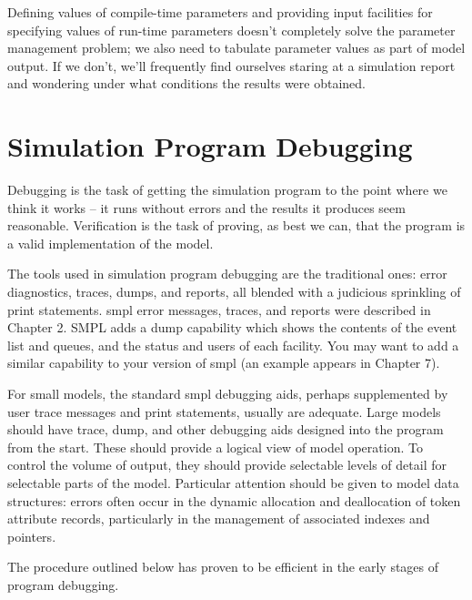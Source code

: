 Defining values of compile-time parameters and providing input facilities for
specifying values of run-time parameters doesn't completely solve the
parameter management problem; we also need to tabulate parameter values as
part of model output. If we don't, we'll frequently find ourselves staring at a
simulation report and wondering under what conditions the results were
obtained.

\section{Simulation Program Debugging}
\label{sec:simulation-program-debugging}

Debugging is the task of getting the simulation program to the point where we
think it works -- it runs without errors and the results it produces seem
reasonable. Verification is the task of proving, as best we can, that the
program is a valid implementation of the model.

The tools used in simulation program debugging are the traditional ones: error
diagnostics, traces, dumps, and reports, all blended with a judicious
sprinkling of print statements. smpl error messages, traces, and reports were
 described in Chapter 2. SMPL adds a dump capability which shows the contents
of the event list and queues, and the status and users of each facility. You
may want to add a similar capability to your version of smpl (an example
appears in Chapter 7).

For small models, the standard smpl debugging aids, perhaps supplemented by
user trace messages and print statements, usually are adequate. Large models
should have trace, dump, and other debugging aids designed into the program
from the start. These should provide a logical view of model operation. To
control the volume of output, they should provide selectable levels of detail
for selectable parts of the model. Particular attention should be given to
model data structures: errors often occur in the dynamic allocation and
deallocation of token attribute records, particularly in the management of
associated indexes and pointers.

The procedure outlined below has proven to be efficient in the early stages of
program debugging.

